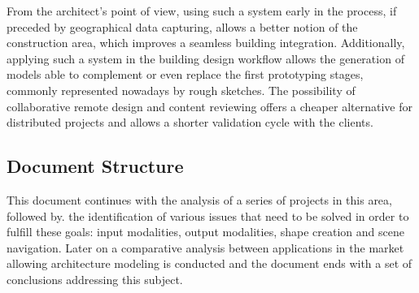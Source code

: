 From the architect's point of view, using such a system early in the process,
if preceded by geographical data capturing,
allows a better notion of the construction area, which improves a seamless building integration.
Additionally, applying such a system in the building design workflow allows
the generation of models able to complement or even replace the first prototyping stages,
commonly represented nowadays by rough sketches.
The possibility of collaborative remote design and content reviewing offers a cheaper
alternative for distributed projects and allows a shorter validation cycle with the clients.

\subsection{Document Structure}
This document continues with
the analysis of a series of projects in this area, followed by.
the identification of various issues that need to be solved in order to fulfill these goals:
input modalities,
output modalities,
shape creation and
scene navigation.
Later on a comparative analysis between applications in the market allowing architecture modeling is conducted
and the document ends with a set of conclusions addressing this subject.
